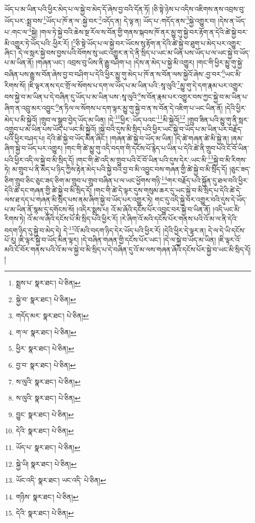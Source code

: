 ཡོད་པ་མ་ཡིན་པའི་ཕྱིར་མེད་པ་ལ་སྐྱེ་བ་མེད་དོ་ཞེས་བྱ་བའི་དོན་ཏོ། །ཅི་སྟེ་ཉེས་པ་འདིས་འཇིགས་ནས་འབྲས་བུ་ཡོད་པར་:སྨྲ་བས་\footnote{སྨྲས་པ་  སྣར་ཐང་།  པེ་ཅིན། }ཡོད་པ་ཁོ་ན་ལ་:སྐྱེ་བར་\footnote{སྐྱེ་བ་  སྣར་ཐང་།  པེ་ཅིན། }འདོད་ན། དེ་ལྟ་ན། ཡོད་པ་:གདོད་ནས་\footnote{གདོད་མར་  སྣར་ཐང་།  པེ་ཅིན། }སྐྱེ་འགྱུར་བ། །དེས་ན་ཡོད་པ་:གང་ལ་\footnote{ག་ལ་  སྣར་ཐང་།  པེ་ཅིན། }སྐྱེ། །གལ་ཏེ་སྐྱེ་བའི་ཆེས་སྔ་རོལ་ས་བོན་གྱི་གནས་སྐབས་ཁོ་ནར་མྱུ་གུ་སྐྱེ་བར་རྟོག་ན་དེའི་ཚེ་སྐྱེ་བར་མི་འགྱུར་ཏེ་ཡོད་པའི་:ཕྱིར་རོ། །\footnote{ཕྱིར་  སྣར་ཐང་།  པེ་ཅིན། }ཅི་སྟེ་ཡོད་པ་ལ་སྐྱེ་བར་ཡོངས་སུ་རྟོག་ན་དེའི་ཚེ་སྐྱེ་བ་ཐུག་པ་མེད་པར་འགྱུར་ཞིང་། དེ་ལ་སླར་སྐྱེ་བས་བྱས་པའི་བོགས་སུ་ཡང་འགྱུར་ན་དེ་ནི་སྲིད་པ་ཡང་མ་ཡིན་པས་ཡོད་པ་ལ་ཡང་སྐྱེ་བ་ཡོད་པ་མ་ཡིན་ནོ། །གཞན་ཡང་། འབྲས་བུ་ཡིས་ནི་རྒྱུ་བཤིག་པ། །དེས་ན་མེད་པ་སྐྱེ་མི་འགྱུར། །གང་གི་ཕྱིར་མྱུ་གུ་སྐྱེ་བཞིན་པས་རྒྱུ་ས་བོན་ཞེས་བྱ་བ་བཤིག་པ་དེའི་ཕྱིར་མྱུ་གུ་མེད་པ་ཁོ་ན་ས་བོན་ལས་སྐྱེའོ་ཞེས་:བྱ་བར་\footnote{བྱ་བ་  སྣར་ཐང་།  པེ་ཅིན། }ཡང་མི་རིགས་སོ། །ཇི་ལྟར་ནས་དང་གྲོ་ལ་སོགས་པ་དག་ལ་ཡོད་པ་མ་ཡིན་པའི་:སཱ་ལུའི་\footnote{ས་ལུའི་  སྣར་ཐང་།  པེ་ཅིན། }མྱུ་གུ་དེ་དག་རྣམ་པར་འགྱུར་བས་སྐྱེ་བ་མ་ཡིན་པ་དེ་བཞིན་དུ་ཡོད་པ་མ་ཡིན་པས་:སཱ་ལུའི་\footnote{ས་ལུའི་  སྣར་ཐང་།  པེ་ཅིན། }ས་བོན་རྣམ་པར་འགྱུར་བས་ཀྱང་སྐྱེ་བ་མ་ཡིན་པ་ཞིག་ན་འབྲུ་མར་འབྱུང་\footnote{བྱུང་  སྣར་ཐང་།  པེ་ཅིན། }ན་ཏིལ་ལ་སོགས་པ་དག་ལྟར་མྱུ་གུ་སྐྱེ་བ་ན་ས་བོན་དེ་འཇིག་པ་ཡང་ཡིན་ནོ། །དེའི་ཕྱིར་མེད་པ་མི་སྐྱེའོ། །གྲུབ་ལ་སྒྲུབ་བྱེད་ཡོད་མ་ཡིན། །དེ་\footnote{དེའི་  སྣར་ཐང་།  པེ་ཅིན། }ཕྱིར་:ཡོད་པའང་\footnote{ཡོད་པ་  སྣར་ཐང་།  པེ་ཅིན། }མི་སྐྱེའོ།\footnote{སྐྱེ་ཡི།  སྣར་ཐང་།  པེ་ཅིན། } །གྲུབ་ཟིན་པའི་མྱུ་གུ་ནི་སླར་འགྲུབ་པ་མ་ཡིན་པས་ཡོད་པ་ཡང་མི་སྐྱེའོ། །སྐྱེ་བའི་དུས་མི་སྲིད་པའི་ཕྱིར་ཡང་སྐྱེ་བ་ཡོད་པ་མ་ཡིན་པར་བརྗོད་པའི་ཕྱིར་བཤད་པ། དེའི་ཚེ་སྐྱེ་བ་ཡོད་མིན་ཞིང་། །གཞན་ཚེ་སྐྱེ་བ་ཡོད་མ་ཡིན། །དེ་ཚེ་གཞན་ཚེ་མི་སྐྱེ་ན། །ནམ་ཞིག་སྐྱེ་བ་ཡོད་པར་འགྱུར། །གང་གི་ཚེ་མྱུ་གུ་འདི་བདག་གི་དངོས་པོ་རྙེད་པ་ཡིན་པ་དེའི་ཚེ་ནི་གྲུབ་པའི་ངོ་བོ་ཡིན་པའི་ཕྱིར་འདི་ལ་སྐྱེ་བ་མི་སྲིད་དོ། །གང་གི་ཚེ་འདི་མ་གྲུབ་པའི་ངོ་བོ་ཡིན་པའི་དུས་དེར་:ཡང་མི་\footnote{ཡོང་འདི་  སྣར་ཐང་། ཡང་འདི་  པེ་ཅིན། }སྐྱེ་བ་མི་རིགས་ཏེ། མ་གྲུབ་པ་ནི་མེད་པ་ཉིད་ཀྱིས་རྟེན་མེད་པའི་སྐྱེ་བའི་བྱ་བ་མི་འབྱུང་བས་གཞན་གྱི་ཚེ་སྐྱེ་བ་མི་སྲིད་དོ། །ཅུང་ཟད་ཅིག་གྲུབ་ཅིང་ཅུང་ཟད་ཅིག་མ་གྲུབ་པ་གྲུབ་བཞིན་པ་ལ་ཡང་ཕྱོགས་གཉི་\footnote{གཉིས་  སྣར་ཐང་།  པེ་ཅིན། }གར་བརྗོད་པའི་སྐྱོན་དུ་ཐལ་བའི་ཕྱིར་དེའི་ཚེ་དང་གཞན་གྱི་ཚེ་སྐྱེ་བ་མི་སྲིད་དོ། །གང་གི་ཚེ་དེ་ལྟར་དུས་གསུམ་ཆར་དུ་ཡང་སྐྱེ་བ་མི་སྲིད་པ་དེའི་ཚེ་དེ་ལས་ཐ་དད་པ་གཞན་མི་སྲིད་པས་ནམ་ཞིག་སྐྱེ་བ་ཡོད་པར་འགྱུར་ཏེ། གང་དུ་འདི་སྐྱེ་བར་འགྱུར་བའི་དུས་དེ་ཡོད་པ་མ་ཡིན་ནོ་སྙམ་དུ་དགོངས་སོ། །འདིར་སྨྲས་པ། འོ་མ་ཞོའི་དངོས་པོར་འབྱུང་བར་སྐྱེ་བ་ཡིན་ནོ། །འདི་ཡང་མི་རིགས་ཏེ། འོ་མ་ལ་ཞོའི་དངོས་པོ་མི་སྲིད་པའི་ཕྱིར་རོ། །རེ་ཞིག་འོ་མའི་དངོས་པོར་གནས་པའི་འོ་མ་ལ་ནི་དེའི་བདག་ཉིད་དུ་སྐྱེ་བ་མེད་དེ། དེ་\footnote{དེའི་  སྣར་ཐང་།  པེ་ཅིན། }འོ་མའི་བདག་ཉིད་དེར་ཡོད་པའི་ཕྱིར་རོ། །དེའི་ཕྱིར་དེ་ལྟར་ན། དེ་ལ་དེ་ཡི་དངོས་པོ་རུ། །ཇི་ལྟར་སྐྱེ་བ་ཡོད་མིན་ལྟར། །དེ་བཞིན་གཞན་གྱི་དངོས་པོར་ཡང་། །དེ་ལ་སྐྱེ་བ་ཡོད་མ་ཡིན། །ཇི་ལྟར་འོ་མའི་ངོ་བོར་གནས་པའི་འོ་མ་ལ་སྐྱེ་བ་མི་སྲིད་པ་དེ་བཞིན་དུ་འོ་མ་ལས་གཞན་ཞོའི་དངོས་པོར་སྐྱེ་བ་ཡང་མི་སྲིད་དོ། །

